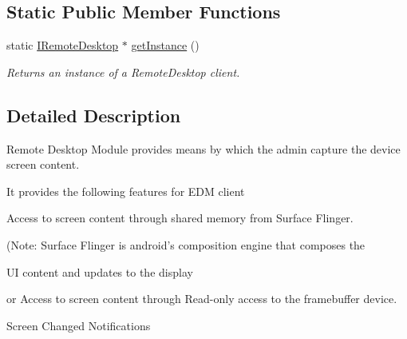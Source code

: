 \subsection*{\-Static \-Public \-Member \-Functions}
\begin{DoxyCompactItemize}
\item 
static \hyperlink{classknoxremotedesktop_1_1IRemoteDesktop}{\-I\-Remote\-Desktop} $\ast$ \hyperlink{classknoxremotedesktop_1_1IRemoteDesktop_a86eefbec946d605470af069999763f74}{get\-Instance} ()
\begin{DoxyCompactList}\small\item\em \-Returns an instance of a \-Remote\-Desktop client. \end{DoxyCompactList}\end{DoxyCompactItemize}


\subsection{\-Detailed \-Description}
\-Remote \-Desktop \-Module provides means by which the admin capture the device screen content. 

\-It provides the following features for \-E\-D\-M client\par



\begin{DoxyItemize}
\item \-Access to screen content through shared memory from \-Surface \-Flinger. \par

\end{DoxyItemize}

(\-Note\-: \-Surface \-Flinger is android's composition engine that composes the

\-U\-I content and updates to the display\par



\begin{DoxyItemize}
\item or \-Access to screen content through \-Read-\/only access to the framebuffer device.\par

\end{DoxyItemize}


\begin{DoxyItemize}
\item \-Screen \-Changed \-Notifications\par

\end{DoxyItemize}


